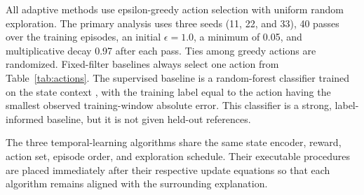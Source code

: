 \documentclass{elektr}
\begin{document}
All adaptive methods use epsilon-greedy action selection with uniform random exploration. The primary analysis uses three seeds (11, 22, and 33), 40 passes over the training episodes, an initial $\epsilon=1.0$, a minimum of 0.05, and multiplicative decay 0.97 after each pass. Ties among greedy actions are randomized. Fixed-filter baselines always select one action from Table~\ref{tab:actions}. The supervised baseline is a random-forest classifier trained on the state context \cite{kwon2024,gao2025,naeini2023}, with the training label equal to the action having the smallest observed training-window absolute error. This classifier is a strong, label-informed baseline, but it is not given held-out references.

The three temporal-learning algorithms share the same state encoder, reward, action set, episode order, and exploration schedule. Their executable procedures are placed immediately after their respective update equations so that each algorithm remains aligned with the surrounding explanation.
\end{document}
